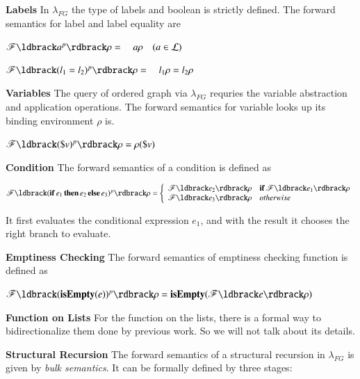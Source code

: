\documentclass{llncs}
\begin{document}
\textbf{Labels} In $\lambda_{FG}$ the type of labels and boolean is strictly defined. The forward semantics for label and label equality are

$\mathscr{F}\ldbrack a^p\rdbrack\rho=\quad a\rho\quad(a\in\mathcal{L})$

$\mathscr{F}\ldbrack (l_1=l_2)^p\rdbrack\rho=\quad l_1\rho=l_2\rho$

\textbf{Variables} The query of ordered graph via $\lambda_{FG}$ requries the variable abstraction and application operations. The forward semantics for variable looks up its binding environment $\rho$ is.

$\mathscr{F}\ldbrack(\$v)^p\rdbrack\rho=\rho(\$v)$

\textbf{Condition} The forward semantics of a condition is defined as

$\mathscr{F}\ldbrack (\mathbf{if}\,e_1\,\mathbf{then}\,e_2\,\mathbf{else}\,e_3)^p\rdbrack\rho=\left\{
    \begin{array}{ll}
     \mathscr{F}\ldbrack e_2\rdbrack\rho& \mathbf{if}\,\mathscr{F}\ldbrack e_1\rdbrack\rho\\
     \mathscr{F}\ldbrack e_3\rdbrack\rho& otherwise
    \end{array}
    \right.$

It first evaluates the conditional expression $e_1$, and with the result it chooses the right branch to evaluate.

\textbf{Emptiness Checking} The forward semantics of emptiness checking function is defined as

$\mathscr{F}\ldbrack(\mathbf{isEmpty}(e))^p\rdbrack\rho=\mathbf{isEmpty}(\mathscr{F}\ldbrack e\rdbrack\rho)$

\textbf{Function on Lists} For the function on the lists, there is a formal way to bidirectionalize them done by previous work. So we will not talk about its details.

\textbf{Structural Recursion} The forward semantics of a structural recursion in $\lambda_{FG}$ is given by \emph{bulk semantics}. It can be formally defined by three stages:
\end{document}
